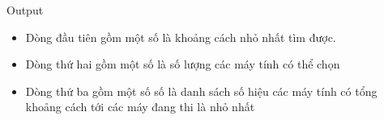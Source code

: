 Output
\begin{itemize}
	\item     Dòng đầu tiên gồm một số là khoảng cách nhỏ nhất tìm được.   
	\item     Dòng thứ hai gồm một số là số lượng các máy tính có thể chọn   
	\item     Dòng thứ ba gồm một số số là danh sách số hiệu các máy tính có tổng khoảng cách tới các máy đang thi là nhỏ nhất   
\end{itemize}